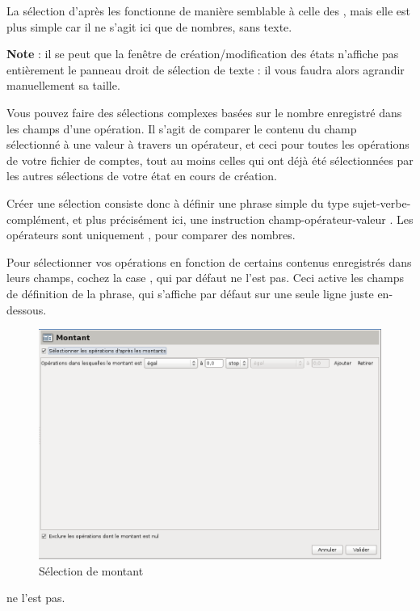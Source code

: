 La sélection d'après les  fonctionne de manière semblable à celle des , mais elle est plus simple car il ne s'agit ici que de nombres, sans texte.

\textbf{Note} : il se peut que la fenêtre de création/modification des états n'affiche  pas entièrement le panneau droit de sélection de texte : il vous faudra alors agrandir manuellement sa taille.

Vous pouvez faire des sélections complexes basées sur le nombre enregistré dans les champs d'une opération. Il s'agit de comparer le contenu du champ sélectionné à une valeur à travers un opérateur, et ceci pour toutes les opérations de votre fichier de comptes, tout au moins celles qui ont déjà été sélectionnées par les autres sélections de votre état en cours de création.

Créer une sélection consiste donc à définir une  phrase simple du type sujet-verbe-complément, et plus précisément ici, une instruction \og champ-opérateur-valeur \fg{}. Les opérateurs sont uniquement , pour comparer des nombres. 

Pour sélectionner vos opérations en fonction de certains contenus enregistrés dans leurs champs, cochez la case , qui par défaut \ifIllustration ne l'est pas. Ceci active les champs de définition de la phrase, qui s'affiche par défaut sur  une seule ligne juste en-dessous.

\begin{figure}[htbp]
\begin{center}
\includegraphics[scale=0.5]{image/screenshot/reportcreation_datas_amounts}
\end{center}
\caption{Sélection de montant}
\label{reportcreation-datas-amounts-img}
\end{figure}
\else ne l'est pas.
\fi

